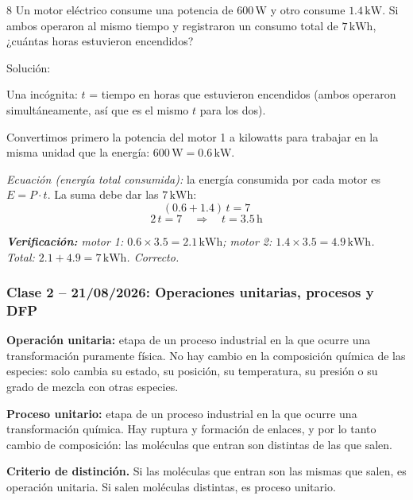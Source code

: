\begin{exercise}{8}{}
Un motor eléctrico consume una potencia de $600\,\mathrm{W}$ y otro
consume $1.4\,\mathrm{kW}$. Si ambos operaron al mismo tiempo y
registraron un consumo total de $7\,\mathrm{kWh}$, ¿cuántas horas
estuvieron encendidos?

Solución:

Una incógnita: $t$ = tiempo en horas que estuvieron encendidos
(ambos operaron simultáneamente, así que es el mismo $t$ para los dos).

Convertimos primero la potencia del motor 1 a kilowatts para
trabajar en la misma unidad que la energía:
$600\,\mathrm{W} = 0.6\,\mathrm{kW}$.

\textit{Ecuación (energía total consumida):} la energía consumida por
cada motor es $E = P \cdot t$. La suma debe dar las $7\,\mathrm{kWh}$:
\[
(0.6 + 1.4)\,t = 7
\]
\[
2\,t = 7 \quad \Rightarrow \quad t = 3.5\,\mathrm{h}
\]

{\small\itshape
\textbf{Verificación:} motor 1: $0.6 \times 3.5 = 2.1\,\mathrm{kWh}$;
motor 2: $1.4 \times 3.5 = 4.9\,\mathrm{kWh}$. Total:
$2.1 + 4.9 = 7\,\mathrm{kWh}$. Correcto.
}
\end{exercise}


{}
\subsubsection*{\textcolor{blueunam}{Clase 2 -- 21/08/2026: Operaciones unitarias, procesos y DFP}}

\textbf{Operación unitaria:} etapa de un proceso industrial en la que
ocurre una transformación puramente física. No hay cambio en la
composición química de las especies: solo cambia su estado, su
posición, su temperatura, su presión o su grado de mezcla con otras
especies.

\textbf{Proceso unitario:} etapa de un proceso industrial en la que
ocurre una transformación química. Hay ruptura y formación de enlaces,
y por lo tanto cambio de composición: las moléculas que entran son
distintas de las que salen.

\textbf{Criterio de distinción.} Si las moléculas que entran son las
mismas que salen, es operación unitaria. Si salen moléculas distintas,
es proceso unitario.

